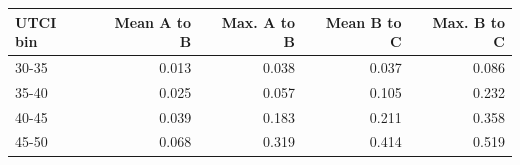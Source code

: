 
\begin{tabular}{lrrrr}
\toprule
UTCI bin & Mean A to B & Max. A to B & Mean B to C & Max. B to C\\
\midrule
30-35 & 0.013 & 0.038 & 0.037 & 0.086\\
35-40 & 0.025 & 0.057 & 0.105 & 0.232\\
40-45 & 0.039 & 0.183 & 0.211 & 0.358\\
45-50 & 0.068 & 0.319 & 0.414 & 0.519\\
\bottomrule
\end{tabular}
